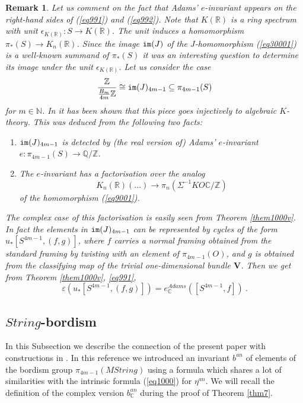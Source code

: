 \documentclass[12pt]{article}
\newtheorem{rem}[theorem]{Remark}
\newcommand{\im}{{\tt im}}
\renewcommand{\ker}{{\tt ker}}
\newcommand{\nat}{{\mathbb{N}}}
\newcommand{\Z}{{\mathbb{Z}}}
\newcommand{\Q}{{\mathbb{Q}}}
\newcommand{\R}{{\mathbb{R}}}
\newcommand{\C}{{\mathbb{C}}}
\newcommand{\bV}{{\mathbf{V}}}
\begin{document}
 

\begin{rem}{\rm  
 Let us comment on the fact that Adams' $e$-invariant appears on the right-hand sides of (\ref{eq991}) and (\ref{eq992}).
Note that $K(\R)$ is a ring spectrum with unit $\epsilon_{K(\R)}:S\to K(\R)$. 
The unit  induces a homomorphism $\pi_{*}(S)\to K_{n}(\R)$. Since the image $\im(J)$ of the $J$-homomorphism
(\ref{eq30001}) is a well-known summand of $\pi_{*}(S)$ it was an interesting question to determine
its image under the unit $\epsilon_{K(\R)}$. Let us consider the case
$$\frac{\Z}{\frac{B_{m}}{4m}\Z}\cong \im(J)_{4m-1}\subseteq \pi_{4m-1}(S)$$
for $m\in \nat$.
In \cite{MR0482758} it has been shown that this piece goes  injectively to algebraic $K$-theory. 
This was deduced from the following  two facts:
\begin{enumerate}
\item $\im(J)_{4m-1}$ is detected by (the real version of) Adams' $e$-invariant
$e:\pi_{4m-1}(S)\to \Q/\Z$.
\item The $e$-invariant has a factorisation over the analog 
$$K_{n}(\R)(\dots)\to \pi_{n}(\Sigma^{-1}KO\C/\Z)$$ 
of the homomorphism (\ref{eq9001}).
\end{enumerate}
The complex case of 
this factorisation is easily seen from Theorem 
 \ref{them1000v}. 
 In fact the elements in $\im(J)_{4m-1}$ can be represented by cycles of the form
 $u_{*}[S^{4m-1},(f,g)]$, where $f$ carries  a normal framing obtained from the standard
 framing by twisting with  an element of $\pi_{4m-1}(O)$, and $g$ is obtained from the classifying map of the trivial one-dimensional bundle $\bV$. Then we get from Theorem \ref{them1000v}, \eqref{eq991},
$$\varepsilon(u_{*}[S^{4m-1},(f,g)])=e_{\C}^{Adams}([S^{4m-1},f])\ .$$
  
 }\end{rem}
 
 
 
 
 
 
 
\subsection{$String$-bordism}\label{subsec55}

In this Subsection we describe the connection of the present paper with constructions 
 in \cite{2009arXiv0912.4875B}. In this reference we introduced an invariant $b^{an}$ of elements of the bordism group $\pi_{4m-1}(MString)$   using a formula which shares a lot of similarities with the intrinsic formula (\ref{eq1000}) for $\eta^{an}$. We will recall the definition of the complex version $b^{an}_{\C}$ during the proof of Theorem \ref{thm7}.
 
\end{document}
